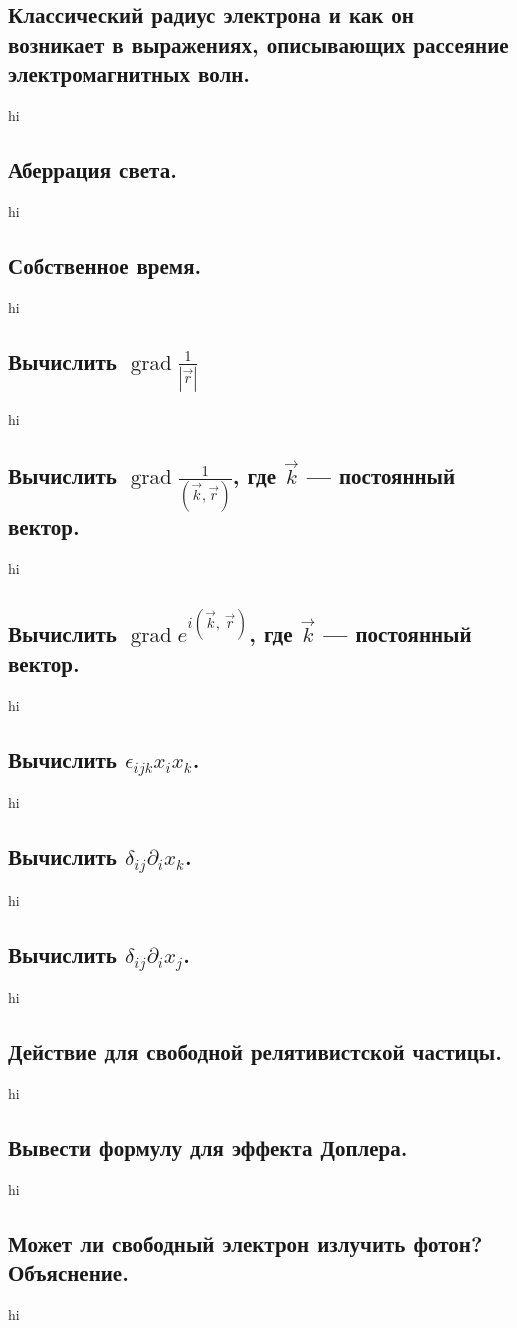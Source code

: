 \documentclass[a4paper,12pt]{article}
\begin{document}
\subsection{Классический радиус электрона и как он возникает в выражениях,
описывающих рассеяние электромагнитных волн.}
hi
\subsection{Аберрация света.}
hi
\subsection{Собственное время.}
hi
\subsection{Вычислить $\operatorname{grad} \frac{1}{\left| \vec{r} \right| }$}
hi
\subsection{Вычислить $\operatorname{grad}
	\frac{1}{\left( \vec{k},\vec{r}\right)}
$, где $\vec{k}$ --- постоянный вектор.}
hi
\subsection{Вычислить $\operatorname{grad} e ^{i\left( \vec{k},\,\vec{r}
\right) }$, где $\vec{k}$ --- постоянный вектор.}
hi
\subsection{Вычислить $\epsilon_{ijk}x_i x_k$.}
hi
\subsection{Вычислить $\delta_{ij}\partial_i x_k$.}
hi
\subsection{Вычислить $\delta_{ij}\partial_i x_j$.}
hi
\subsection{Действие для свободной релятивистской частицы.}
hi
\subsection{Вывести формулу для эффекта Доплера.}
hi
\subsection{Может ли свободный электрон излучить фотон? Объяснение.}
hi
\end{document}
